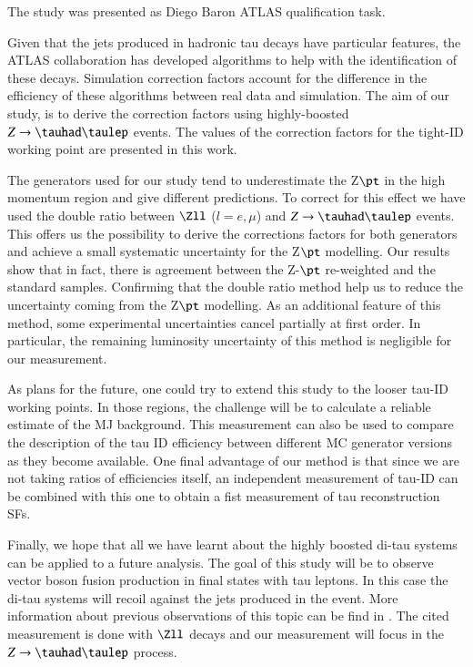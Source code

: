 The study was presented as Diego Baron ATLAS qualification task.

Given that the jets produced in hadronic tau decays have particular features, the ATLAS collaboration has developed algorithms to help with the identification of these decays. Simulation correction factors account for the difference in the efficiency of these algorithms between real data and simulation. The aim of our study, is to derive the correction factors using highly-boosted $Z\to\tauhad\taulep$ events. The values of the correction factors for the tight-ID working point are presented in this work. 

The generators used for our study tend to underestimate the Z$\pt$ in the high momentum region and give different predictions. To correct for this effect we have used the double ratio between $\Zll$ ($l=e,\mu$) and $Z\to\tauhad\taulep$ events. This offers us the possibility to derive the corrections factors for both generators and achieve a small systematic uncertainty for the Z$\pt$ modelling. Our results show that in fact, there is agreement between the Z-$\pt$ re-weighted and the standard samples. Confirming that the double ratio method help us to reduce the uncertainty coming from the Z$\pt$ modelling. As an additional feature of this method, some experimental uncertainties cancel partially at first order. In particular, the remaining luminosity uncertainty of this method is negligible for our measurement.


As plans for the future, one could try to extend this study to the looser tau-ID working points. In those regions, the challenge will be to calculate a reliable estimate of the MJ background. This measurement can also be used to compare the description of the tau ID efficiency between different MC generator versions as they become available. One final advantage of our method is that since we are not taking ratios of efficiencies itself, an independent measurement of tau-ID can be combined with this one to obtain a fist measurement of tau reconstruction SFs.

Finally, we hope that all we have learnt about the highly boosted di-tau systems can be applied to a future analysis.  The goal of this study will be to observe vector boson fusion production in final states with tau leptons. In this case the di-tau systems will recoil against the jets produced in the event. More information about previous observations of this topic can be find in \cite{Aad:2014dta,Aaboud:2017emo}. The cited measurement is done with $\Zll$ decays and our measurement will focus in the $Z\to\tauhad\taulep$ process.